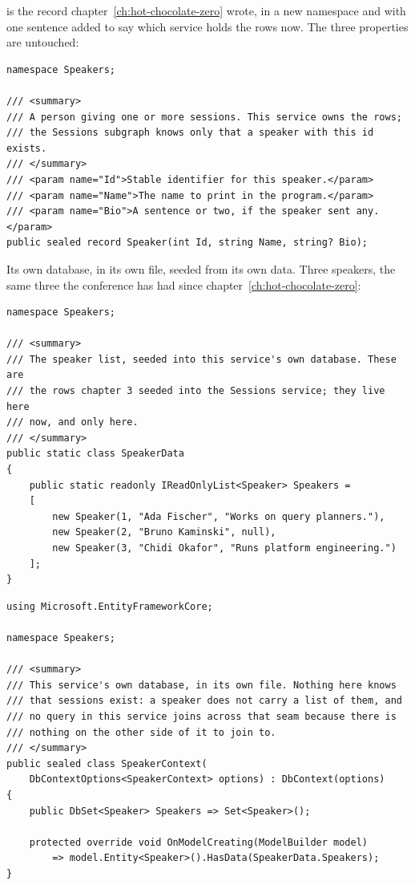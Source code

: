 %
 is the record chapter~\ref{ch:hot-chocolate-zero} wrote, in a
new namespace and with one sentence added to say which service holds the rows
now. The three properties are untouched:

\begin{verbatim}
namespace Speakers;

/// <summary>
/// A person giving one or more sessions. This service owns the rows;
/// the Sessions subgraph knows only that a speaker with this id exists.
/// </summary>
/// <param name="Id">Stable identifier for this speaker.</param>
/// <param name="Name">The name to print in the program.</param>
/// <param name="Bio">A sentence or two, if the speaker sent any.</param>
public sealed record Speaker(int Id, string Name, string? Bio);
\end{verbatim}

%
Its own database, in its own file, seeded from its own data. Three speakers,
the same three the conference has had since chapter~\ref{ch:hot-chocolate-zero}:

\begin{verbatim}
namespace Speakers;

/// <summary>
/// The speaker list, seeded into this service's own database. These are
/// the rows chapter 3 seeded into the Sessions service; they live here
/// now, and only here.
/// </summary>
public static class SpeakerData
{
    public static readonly IReadOnlyList<Speaker> Speakers =
    [
        new Speaker(1, "Ada Fischer", "Works on query planners."),
        new Speaker(2, "Bruno Kaminski", null),
        new Speaker(3, "Chidi Okafor", "Runs platform engineering.")
    ];
}
\end{verbatim}

\begin{verbatim}
using Microsoft.EntityFrameworkCore;

namespace Speakers;

/// <summary>
/// This service's own database, in its own file. Nothing here knows
/// that sessions exist: a speaker does not carry a list of them, and
/// no query in this service joins across that seam because there is
/// nothing on the other side of it to join to.
/// </summary>
public sealed class SpeakerContext(
    DbContextOptions<SpeakerContext> options) : DbContext(options)
{
    public DbSet<Speaker> Speakers => Set<Speaker>();

    protected override void OnModelCreating(ModelBuilder model)
        => model.Entity<Speaker>().HasData(SpeakerData.Speakers);
}
\end{verbatim}

